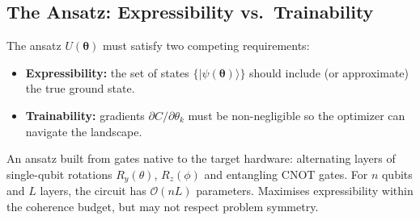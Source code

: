 \documentclass[a4paper,11pt]{article}
\newcommand{\ket}[1]{|#1\rangle}
\begin{document}
\begin{center}
\end{center}

\subsection{The Ansatz: Expressibility vs.\ Trainability}

The ansatz $U(\boldsymbol\theta)$ must satisfy two competing requirements:
\begin{itemize}
    \item \textbf{Expressibility:} the set of states
          $\{\ket{\psi(\boldsymbol\theta)}\}$ should include (or approximate)
          the true ground state.
    \item \textbf{Trainability:} gradients $\partial C/\partial\theta_k$
          must be non-negligible so the optimizer can navigate the landscape.
\end{itemize}

\begin{defbox}
An ansatz built from gates native to the target hardware:
alternating layers of single-qubit rotations $R_y(\theta)$, $R_z(\phi)$
and entangling CNOT gates. For $n$ qubits and $L$ layers, the circuit has
$\mathcal{O}(nL)$ parameters. Maximises expressibility within the coherence
budget, but may not respect problem symmetry.
\end{defbox}
\end{document}
